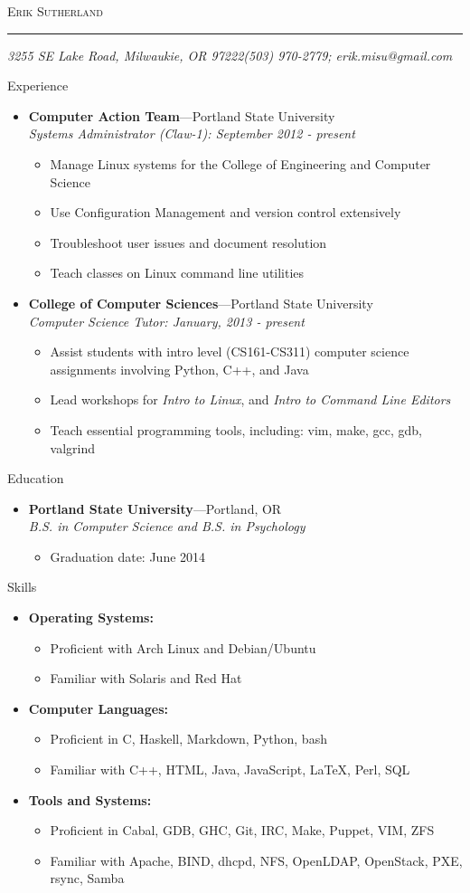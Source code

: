 \documentclass[11pt,oneside]{article}
\makeatletter
\newcommand{\name}{Erik Sutherland}
\newcommand{\addr}{3255 SE Lake Road, Milwaukie, OR 97222}
\newcommand{\phone}{(503) 970-2779}
\newcommand{\email}{erik.misu@gmail.com}
\newcommand{\bigname}[1]{
	\begin{center}\fontfamily{phv}\selectfont\Huge\scshape#1\end{center}
}
\newenvironment{ressection}[1]{
	\vspace{4pt}
	{\fontfamily{phv}\selectfont\Large#1}
	\begin{itemize}
	\vspace{3pt}
}{
	\end{itemize}
}
\newcommand{\resitem}[1]{
	\vspace{-4pt}
	\item \begin{flushleft} #1 \end{flushleft}
}
\newcommand{\ressubitem}[1]{
	\vspace{-1pt}
	\item \begin{flushleft} #1 \end{flushleft}
}
\newcommand{\resbigitem}[3]{
	\vspace{-5pt}
	\item
	\textbf{#1}---#2 \\
	\textit{#3}
}
\newenvironment{ressubsec}[3]{
	\resbigitem{#1}{#2}{#3}
	\vspace{-2pt}
	\begin{itemize}
}{
	\end{itemize}
}
\newenvironment{reslist}[1]{
	\resitem{\textbf{#1}}
	\vspace{-5pt}
	\begin{itemize}
}{
	\end{itemize}
}
\makeatother
\begin{document}
 \selectfont
\bigname{\name}
\vspace{-8pt} \rule{\textwidth}{1pt}
\vspace{-1pt} {\small\itshape \addr \hfill \phone; \email}
\vspace{8 pt}


\begin{ressection}{Experience}
    \begin{ressubsec}{Computer Action Team}{Portland State University}{Systems Administrator (Claw-1): September 2012 - present}
        \ressubitem{Manage Linux systems for the College of Engineering and Computer Science}
        \ressubitem{Use Configuration Management and version control extensively}
		\ressubitem{Troubleshoot user issues and document resolution}
        \ressubitem{Teach classes on Linux command line utilities}
	\end{ressubsec}
	\begin{ressubsec}{College of Computer Sciences}{Portland State University}{Computer Science Tutor: January, 2013 - present}
        \ressubitem{Assist students with intro level (CS161-CS311) computer science assignments involving Python, C++, and Java}
        \ressubitem{Lead workshops for \textit{Intro to Linux}, and \textit{Intro to Command Line Editors}}
        \ressubitem{Teach essential programming tools, including: vim, make, gcc, gdb, valgrind}
	\end{ressubsec}
\end{ressection}


\begin{ressection}{Education}
    \begin{ressubsec}{Portland State University}{Portland, OR}{B.S. in Computer Science and B.S. in Psychology}
		\ressubitem{Graduation date: June 2014}
	\end{ressubsec}
\end{ressection}


\begin{ressection}{Skills}
    \begin{reslist}{Operating Systems:}
        \ressubitem{Proficient with Arch Linux and Debian/Ubuntu}
        \ressubitem{Familiar with Solaris and Red Hat}
	\end{reslist}
	\begin{reslist}{Computer Languages:}
        \ressubitem{Proficient in C, Haskell, Markdown, Python, bash}
        \ressubitem{Familiar with C++, HTML, Java, JavaScript, \LaTeX, Perl, SQL}
	\end{reslist}
	\begin{reslist}{Tools and Systems:}
        \ressubitem{Proficient in Cabal, GDB, GHC, Git, IRC, Make, Puppet, VIM, ZFS}
        \ressubitem{Familiar with Apache, BIND, dhcpd, NFS, OpenLDAP, OpenStack, PXE, rsync, Samba}
	\end{reslist}
\end{ressection}
\end{document}
